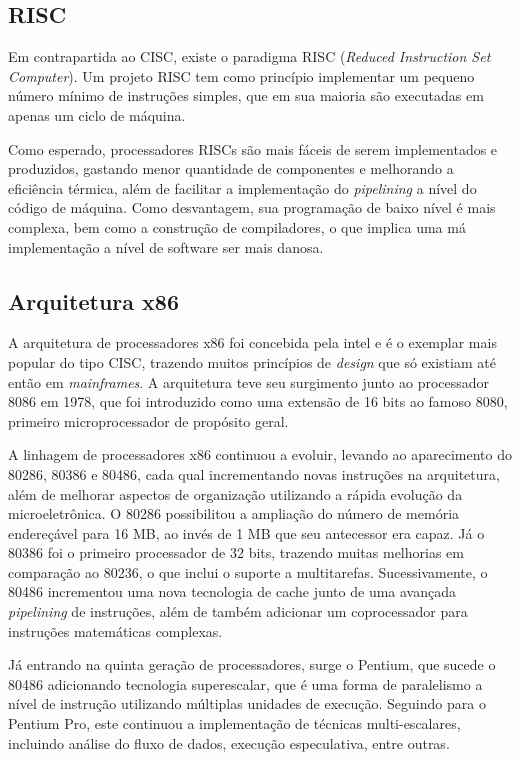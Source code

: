 \documentclass{article}
\begin{document}
\subsection{RISC}
Em contrapartida ao CISC, existe o paradigma RISC (\textit{Reduced Instruction
Set Computer}). Um projeto RISC tem como princípio implementar um pequeno número
mínimo de instruções simples, que em sua maioria são executadas em apenas um
ciclo de máquina.

Como esperado, processadores RISCs são mais fáceis de serem implementados e
produzidos, gastando menor quantidade de componentes e melhorando a eficiência
térmica, além de facilitar a implementação do \textit{pipelining} a nível do
código de máquina. Como desvantagem, sua programação de baixo nível é mais
complexa, bem como a construção de compiladores, o que implica uma má
implementação a nível de software ser mais danosa.

\subsection{Arquitetura x86} 
A arquitetura de processadores x86 foi concebida pela intel e é o exemplar mais
popular do tipo CISC, trazendo muitos princípios de \textit{design} que só
existiam até então em \textit{mainframes}. A arquitetura teve seu surgimento
junto ao processador 8086 em 1978, que foi introduzido como uma extensão de 16
bits ao famoso 8080, primeiro microprocessador de propósito geral.

A linhagem de processadores x86 continuou a evoluir, levando ao aparecimento do
80286, 80386 e 80486, cada qual incrementando novas instruções na arquitetura,
além de melhorar aspectos de organização utilizando a rápida evolução da
microeletrônica. O 80286 possibilitou a ampliação do número de memória
endereçável para 16 MB, ao invés de 1 MB que seu antecessor era capaz. Já o
80386 foi o primeiro processador de 32 bits, trazendo muitas melhorias em
comparação ao 80236, o que inclui o suporte a multitarefas. Sucessivamente, o
80486 incrementou uma nova tecnologia de cache junto de uma avançada
\textit{pipelining} de instruções, além de também adicionar um coprocessador
para instruções matemáticas complexas.

Já entrando na quinta geração de processadores, surge o Pentium, que sucede o
80486 adicionando tecnologia superescalar, que é uma forma de paralelismo a
nível de instrução utilizando múltiplas unidades de execução. Seguindo para o
Pentium Pro, este continuou a implementação de técnicas multi-escalares,
incluindo análise do fluxo de dados, execução especulativa, entre outras.
\end{document}
